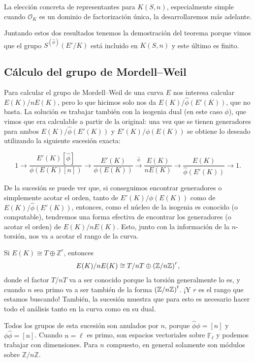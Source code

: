 \documentclass[a4paper]{book}
\theoremstyle{definition}
\theoremstyle{plain}
\newcommand{\nbd}{\nobreakdash}
\newcommand{\ZZ}{\mathbb{Z}}
\newcommand{\FF}{\mathbb{F}}
\newcommand{\OO}{\mathcal{O}}
\newcommand{\lp}{\left\lparen}
\newcommand{\rp}{\right\rparen}
\begin{document}
La elección concreta de representantes para $K(S,n)$, especialmente simple cuando $\OO_K$ es un dominio de factorización única, la desarrollaremos más adelante.

Juntando estos dos resultados tenemos la demostración del teorema porque vimos que el grupo $S^{(\hat\phi)}(E'/K)$ está incluido en $K(S,n) $ y este último es finito.

\subsection{Cálculo del grupo de Mordell--Weil}

Para calcular el grupo de Mordell--Weil de una curva $E$ nos interesa calcular $E(K) / nE(K)$, pero lo que hicimos solo nos da $E(K) / \hat\phi (E'(K))$, que no basta. La solución es trabajar también con la isogenia dual (en este caso $\phi$), que vimos que era calculable a partir de la original: una vez que se tienen generadores para ambos $E(K) / \hat{\phi} (E'(K))$ y $E'(K) / \phi (E(K))$ se obtiene lo deseado utilizando la siguiente sucesión exacta:

\begin{equation}\label{eq:cocientesIsogenias}
1 \to \frac{E'(K)[\hat\phi]}{\phi(E(K)[n])} \to
\frac{E'(K)}{\phi(E(K))} \xrightarrow{\hat\phi} 
\frac{E(K)}{nE(K)} \to 
\frac{E(K)}{\hat\phi(E'(K))} \to 1.
\end{equation}

De la sucesión se puede ver que, si conseguimos encontrar generadores o simplemente acotar el orden, tanto de $E'(K) / \phi (E(K))$ como de $E(K) / \hat\phi (E'(K))$, entonces, como el núcleo de la isogenia es conocido (o computable), tendremos una forma efectiva de encontrar los generadores (o acotar el orden) de $E(K)/nE(K)$. Esto, junto con la información de la $n$\nbd-torsión, nos va a acotar el rango de la curva.

Si $E(K)\cong T \oplus \ZZ^r$, entonces 
\[
E(K)/nE(K) \cong  T/nT \oplus {\lp \ZZ/n\ZZ \rp}^r,
\]
donde el factor $T/nT$ va a ser conocido porque la torsión generalmente lo es, y cuando $n$ sea primo va a ser también de la forma ${\lp \ZZ/n\ZZ \rp}^t$. ¡Y $r$ es el rango que estamos buscando! También, la sucesión muestra que para esto es necesario hacer todo el análisis tanto en la curva como en su dual.

Todos los grupos de esta sucesión son anulados por $n$, porque $\hat\phi\phi=[n]$ y $\phi\hat\phi=[n]$. Cuando $n=\ell$ es primo, son espacios vectoriales sobre $\FF_\ell$ y podemos trabajar con dimensiones. Para $n$ compuesto, en general solamente son módulos sobre $\ZZ/n\ZZ$.
\end{document}
